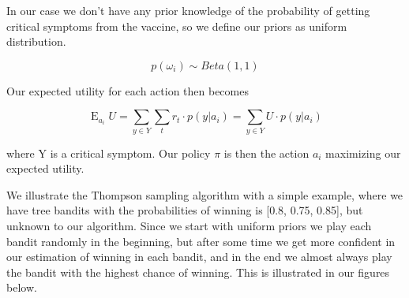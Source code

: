 \documentclass{article}
\begin{document}
In our case we don't have any prior knowledge of the probability of getting critical symptoms from the vaccine, so we define our priors as uniform distribution.

\[p(\omega_{i}) \sim Beta(1, 1)\]

Our expected utility for each action then becomes 

$$
\operatorname{E}_{a_i} U = \sum_{y\in Y} \sum\limits_{t} r_{t}\cdot p(y|a_i) = \sum_{y\in Y} U \cdot p(y|a_i)
$$

where Y is a critical symptom. Our policy $\pi$ is then the action $a_{i}$ maximizing our expected utility.




We illustrate the Thompson sampling algorithm with a simple example, where we have tree bandits with the probabilities of winning is [0.8, 0.75, 0.85], but unknown to our algorithm. Since we start with uniform priors we play each bandit randomly in the  beginning, but after some time we get more confident in our estimation of winning in each bandit, and in the end we  almost always play the bandit with the highest chance of winning. This is illustrated in our figures below.
\end{document}
